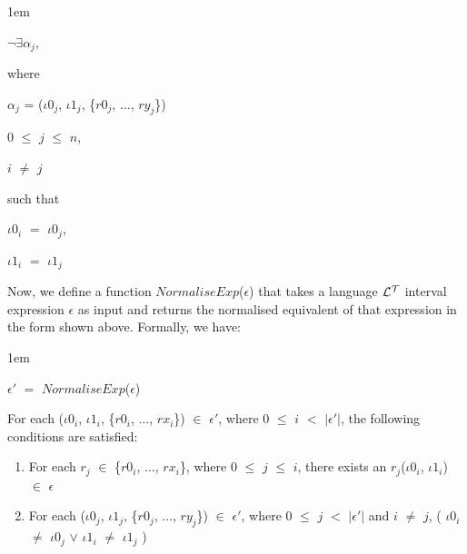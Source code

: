 \documentclass[11pt]{report}
\newenvironment{vquote}
{
  \begin{list}{}{\leftmargin 1em}\item[]
}
{
  \end{list}
}
\begin{document}
            \begin{vquote}
              $\lnot$$\exists$${\alpha}_j$,

              where

              \hspace{1em}
              ${\alpha}_j$ =
                (${\iota}0_j$, ${\iota}1_j$, \{$r0_j$, $\ldots$, $ry_j$\})

              \hspace{1em}
              $0$ $\leq$ $j$ $\leq$ $n$,

              \hspace{1em}
              $i$ $\neq$ $j$

              such that

              \hspace{1em}
              ${\iota}0_i$ $=$ ${\iota}0_j$,

              \hspace{1em}
              ${\iota}1_i$ $=$ ${\iota}1_j$
            \end{vquote}

            Now, we define a function $NormaliseExp$($\epsilon$) that takes
            a language ${\cal L^T}$ interval expression $\epsilon$ as
            input and returns the normalised equivalent of that expression in
            the form shown above. Formally, we have:

            \begin{vquote}
              ${\epsilon}'$ $=$ $NormaliseExp$($\epsilon$)
            \end{vquote}

            \noindent
            For each
            (${\iota}0_i$, ${\iota}1_i$, \{$r0_i$, $\ldots$, $rx_i$\})
            $\in$ ${\epsilon}'$,
            where $0$ $\leq$ $i$ $<$ $|{\epsilon}'|$, the following
            conditions are satisfied:

            \begin{enumerate}
              \item
                For each $r_j$ $\in$ \{$r0_i$, $\ldots$, $rx_i$\}, where $0$
                $\leq$ $j$ $\leq$ $i$, there exists an
                $r_j$(${\iota}0_i$, ${\iota}1_i$) $\in$ $\epsilon$

              \item
                For each
                (${\iota}0_j$, ${\iota}1_j$, \{$r0_j$, $\ldots$, $ry_j$\})
                $\in$ ${\epsilon}'$, where $0$ $\leq$ $j$ $<$
                $|{\epsilon}'|$ and $i$ $\neq$ $j$,
                (
                  ${\iota}0_i$ $\neq$ ${\iota}0_j$ $\lor$
                  ${\iota}1_i$ $\neq$ ${\iota}1_j$
                )
            \end{enumerate}
\end{document}

